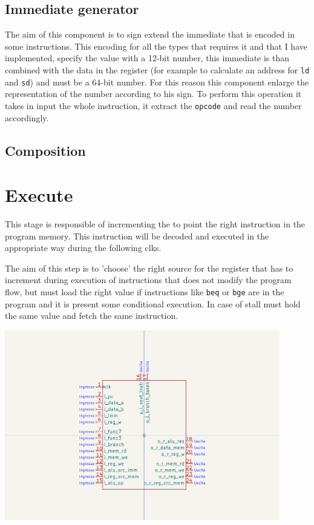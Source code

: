 \documentclass{article}
\begin{document}
\subsection{Immediate generator}\label{immgen}
The aim of this component is to sign extend the immediate that is encoded in some instructions. This encoding for all the types that requires it and that I have implemented, specify the value with a 12-bit number, this immediate is than combined with the data in the register (for example to calculate an address for \texttt{ld} and \texttt{sd}) and must be a 64-bit number. For this reason this component enlarge the representation of the number according to his sign. To perform this operation it takes in input the whole instruction, it extract the \texttt{opcode} and read the number accordingly.
\subsection*{Composition}


\section{Execute}
\begin{minipage}{0.48\textwidth}
This stage is responsible of incrementing the \PC to point the right instruction in the program memory.
This instruction will be decoded and executed in the appropriate way during the following \glspl{clk}. 

The aim of this step is to 'choose' the right source for the \PC register that has to increment during execution of instructions that does not modify the program flow, but must load the right value if instructions like \texttt{beq} or \texttt{bge} are in the program and it is present some conditional execution.
In case of \gls{stall} must hold the same value and fetch the same instruction.
\end{minipage}
\begin{minipage}{0.48\textwidth}
  \includegraphics[width=0.9\textwidth,right,trim={400 150 400 150},clip]{components/Execute.png}
\end{minipage}
\end{document}

